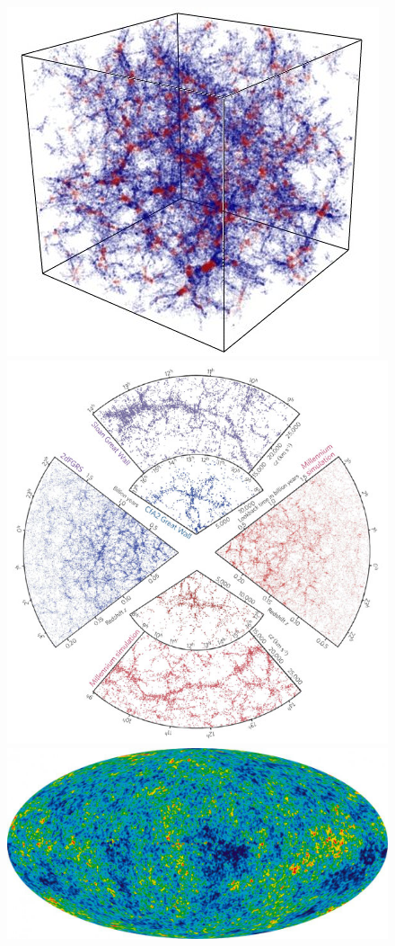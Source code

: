 \documentclass[12pt]{article}
\begin{document}
\begin{figure}[!htb]
  \centering
  \includegraphics[width=0.9\linewidth]{LCDMstructure.jpg}
\endminipage\hfill
{}
  \centering
  \includegraphics[width=0.9\linewidth]{nature04805-f1_2.jpg}
\endminipage\hfill
{}
  \centering
  \includegraphics[width=0.8\linewidth]{simulation.jpg}

\end{figure}
\end{document}
